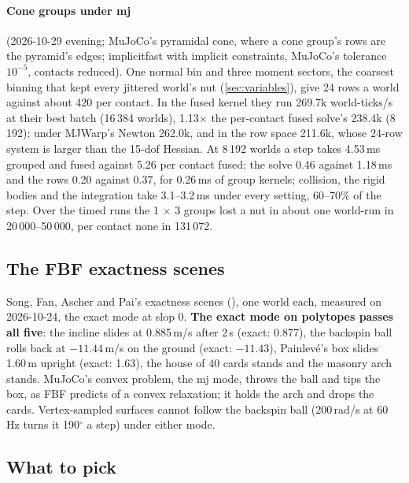\paragraph{Cone groups under mj} (2026-10-29 evening; MuJoCo's pyramidal cone, where a cone group's rows are the pyramid's edges; implicitfast with implicit constraints, MuJoCo's tolerance $10^{-5}$, contacts reduced). One normal bin and three moment sectors, the coarsest binning that kept every jittered world's nut (\cref{sec:variables}), give 24 rows a world against about 420 per contact. In the fused kernel they run 269.7k world-ticks/s at their best batch (16\,384 worlds), 1.13$\times$ the per-contact fused solve's 238.4k (8\,192); under MJWarp's Newton 262.0k, and in the row space 211.6k, whose 24-row system is larger than the 15-dof Hessian. At 8\,192 worlds a step takes 4.53\,ms grouped and fused against 5.26 per contact fused: the solve 0.46 against 1.18\,ms and the rows 0.20 against 0.37, for 0.26\,ms of group kernels; collision, the rigid bodies and the integration take 3.1--3.2\,ms under every setting, 60--70\% of the step. Over the timed runs the 1 $\times$ 3 groups lost a nut in about one world-run in 20\,000--50\,000, per contact none in 131\,072.

\subsection{The FBF exactness scenes}\label{sec:fbf}

Song, Fan, Ascher and Pai's exactness scenes \cite{fbf} (), one world each, measured on 2026-10-24, the exact mode at slop 0. \textbf{The exact mode on polytopes passes all five}: the incline slides at 0.885\,m/s after 2\,s (exact: 0.877), the backspin ball rolls back at $-11.44$\,m/s on the ground (exact: $-11.43$), Painlev\'e's box slides 1.60\,m upright (exact: 1.63), the house of 40 cards stands and the masonry arch stands. MuJoCo's convex problem, the mj mode, throws the ball and tips the box, as FBF predicts of a convex relaxation; it holds the arch and drops the cards. Vertex-sampled surfaces cannot follow the backspin ball (200\,rad/s at 60\,Hz turns it 190$^\circ$ a step) under either mode.

\subsection{What to pick}\label{sec:pick}

